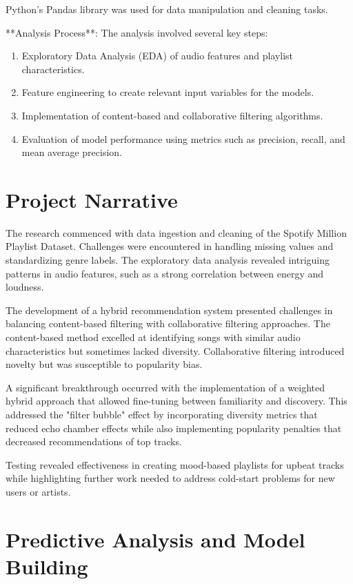 \documentclass[runningheads]{llncs}
\begin{document}
Python's Pandas library was used for data manipulation and cleaning tasks.

**Analysis Process**: The analysis involved several key steps:
\begin{enumerate}
    \item Exploratory Data Analysis (EDA) of audio features and playlist characteristics.
    \item Feature engineering to create relevant input variables for the models.
    \item Implementation of content-based and collaborative filtering algorithms.
    \item Evaluation of model performance using metrics such as precision, recall, and mean average precision.
\end{enumerate}

\section{Project Narrative}

The research commenced with data ingestion and cleaning of the Spotify Million Playlist Dataset. Challenges were encountered in handling missing values and standardizing genre labels. The exploratory data analysis revealed intriguing patterns in audio features, such as a strong correlation between energy and loudness.

The development of a hybrid recommendation system presented challenges in balancing content-based filtering with collaborative filtering approaches. The content-based method excelled at identifying songs with similar audio characteristics but sometimes lacked diversity. Collaborative filtering introduced novelty but was susceptible to popularity bias.

A significant breakthrough occurred with the implementation of a weighted hybrid approach that allowed fine-tuning between familiarity and discovery. This addressed the "filter bubble" effect by incorporating diversity metrics that reduced echo chamber effects while also implementing popularity penalties that decreased recommendations of top tracks.

Testing revealed effectiveness in creating mood-based playlists for upbeat tracks while highlighting further work needed to address cold-start problems for new users or artists.

\section{Predictive Analysis and Model Building}
\end{document}
